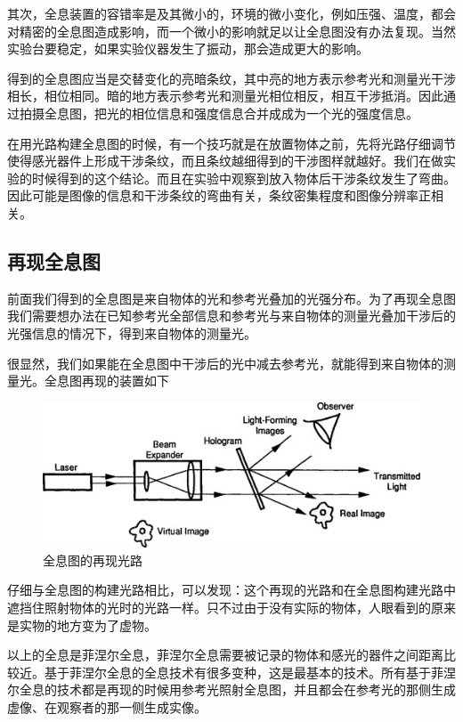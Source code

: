 \documentclass{article}
\begin{document}
\begin{multicols}{2}
其次，全息装置的容错率是及其微小的，环境的微小变化，例如压强、温度，都会对精密的全息图造成影响，而一个微小的影响就足以让全息图没有办法复现。当然实验台要稳定，如果实验仪器发生了振动，那会造成更大的影响。

得到的全息图应当是交替变化的亮暗条纹，其中亮的地方表示参考光和测量光干涉相长，相位相同。暗的地方表示参考光和测量光相位相反，相互干涉抵消。因此通过拍摄全息图，把光的相位信息和强度信息合并成成为一个光的强度信息。

在用光路构建全息图的时候，有一个技巧就是在放置物体之前，先将光路仔细调节使得感光器件上形成干涉条纹，而且条纹越细得到的干涉图样就越好。我们在做实验的时候得到的这个结论。而且在实验中观察到放入物体后干涉条纹发生了弯曲。因此可能是图像的信息和干涉条纹的弯曲有关，条纹密集程度和图像分辨率正相关。

\subsection{再现全息图}

前面我们得到的全息图是来自物体的光和参考光叠加的光强分布。为了再现全息图我们需要想办法在已知参考光全部信息和参考光与来自物体的测量光叠加干涉后的光强信息的情况下，得到来自物体的测量光。

很显然，我们如果能在全息图中干涉后的光中减去参考光，就能得到来自物体的测量光。全息图再现的装置如下

\begin{figure}[H]
  \centering
  \includegraphics[width=0.9\linewidth]{figures/全息图的再现}
  \caption{全息图的再现光路}
\end{figure}

仔细与全息图的构建光路相比，可以发现：这个再现的光路和在全息图构建光路中遮挡住照射物体的光时的光路一样。只不过由于没有实际的物体，人眼看到的原来是实物的地方变为了虚物。

以上的全息是菲涅尔全息，菲涅尔全息需要被记录的物体和感光的器件之间距离比较近。基于菲涅尔全息的全息技术有很多变种，这是最基本的技术。所有基于菲涅尔全息的技术都是再现的时候用参考光照射全息图，并且都会在参考光的那侧生成虚像、在观察者的那一侧生成实像。


\end{multicols}
\end{document}
